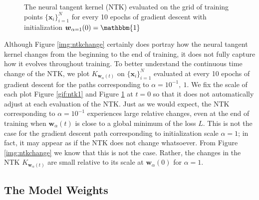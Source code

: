 \documentclass{article}
\begin{document}
\begin{figure}[H]
\caption{The neural tangent kernel (NTK) evaluated on the grid of training points $\{ \boldsymbol{x}_i \}_{i=1}^N$ for every 10 epochs of gradient descent with initialization $\boldsymbol{w}_{\alpha = 1}(0) = \mathbbm{1}$}\label{gif:ntk2}
\end{figure}

Although Figure \ref{img:ntkchange} certainly does portray how the neural tangent kernel changes from the beginning to the end of training, it does not fully capture how it evolves throughout training. To better understand the continuous time change of the NTK, we plot $K_{\boldsymbol{w}_{\alpha}(t)}$ on $\{ \boldsymbol{x}_i \}_{i=1}^N$ evaluated at every 10 epochs of gradient descent for the paths corresponding to $\alpha = 10^{-1}, \ 1$. We fix the scale of each plot Figure \ref{gif:ntk1} and Figure \ref{gif:ntk2} at $t = 0$ so that it does not automatically adjust at each evaluation of the NTK. Just as we would expect, the NTK corresponding to $\alpha = 10^{-1}$ experiences large relative changes, even at the end of training when $\boldsymbol{w}_{\alpha}(t)$ is close to a global minimum of the loss $L$. This is not the case for the gradient descent path corresponding to initialization scale $\alpha = 1$; in fact, it may appear as if the NTK does not change whatsoever. From Figure \ref{img:ntkchange} we know that this is not the case. Rather, the changes in the NTK $K_{\boldsymbol{w}_{\alpha}(t)}$ are small relative to its scale at $\boldsymbol{w}_{\alpha}(0)$ for $\alpha = 1$.

\subsection{The Model Weights}
\end{document}
